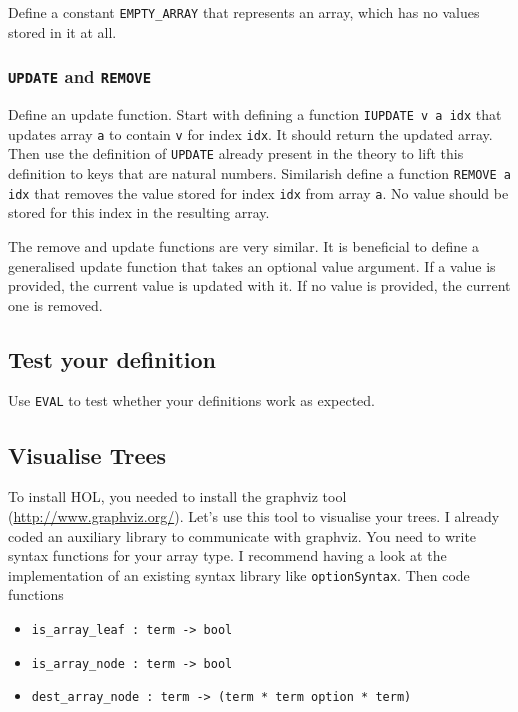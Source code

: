 \documentclass[a4paper,10pt,oneside]{scrartcl}
\begin{document}
Define a constant \texttt{EMPTY\_ARRAY} that represents an array, which has no values stored in it at all.


\subsubsection{\texttt{UPDATE} and \texttt{REMOVE}}

Define an update function. Start with defining a function \texttt{IUPDATE v a idx} that updates array \texttt{a} to contain \texttt{v} for index \texttt{idx}. It should return the updated array. Then use the definition of \texttt{UPDATE} already present in the theory to lift this definition to keys that are natural numbers.
Similarish define a function \texttt{REMOVE a idx} that removes the value stored for index \texttt{idx} from array \texttt{a}. No value should be stored for this index in the resulting array. 

The remove and update functions are very similar. It is beneficial to define a generalised update function that takes an optional value argument. If a value is provided, the current value is updated with it. If no value is provided, the current one is removed.

\subsection{Test your definition}

Use \texttt{EVAL} to test whether your definitions work as expected.


\subsection{Visualise Trees}

To install HOL, you needed to install the graphviz tool 
(\url{http://www.graphviz.org/}). Let's use this tool to visualise your trees.
I already coded an auxiliary library to communicate with graphviz. You need to
write syntax functions for your array type. I recommend having a look at the implementation
of an existing syntax library like \texttt{optionSyntax}. Then code functions

\begin{itemize}
\item \texttt{is\_array\_leaf :\ term -> bool}
\item \texttt{is\_array\_node :\ term -> bool}
\item \texttt{dest\_array\_node :\ term -> (term * term option * term)}
\end{itemize}
\end{document}
